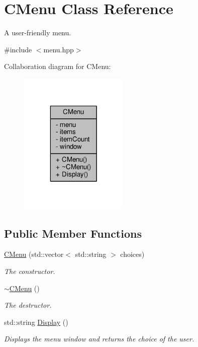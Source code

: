 \hypertarget{class_c_menu}{\section{C\-Menu Class Reference}
\label{class_c_menu}
}


A user-\/friendly menu.  




{\ttfamily \#include $<$menu.\-hpp$>$}



Collaboration diagram for C\-Menu\-:
\nopagebreak
\begin{figure}[H]
\begin{center}
\leavevmode
\includegraphics[width=148pt]{class_c_menu__coll__graph}
\end{center}
\end{figure}
\subsection*{Public Member Functions}
\begin{DoxyCompactItemize}
\item 
\hyperlink{class_c_menu_a8b1ad64c4215258c64d0e5d5a622ba76}{C\-Menu} (std\-::vector$<$ std\-::string $>$ choices)
\begin{DoxyCompactList}\small\item\em The constructor. \end{DoxyCompactList}\item 
\hyperlink{class_c_menu_ab2ab7e24e646bcb61ad0b9d8484f2604}{$\sim$\-C\-Menu} ()
\begin{DoxyCompactList}\small\item\em The destructor. \end{DoxyCompactList}\item 
std\-::string \hyperlink{class_c_menu_a6cc86670a0f6bfc0ac9a97d938226b5c}{Display} ()
\begin{DoxyCompactList}\small\item\em Displays the menu window and returns the choice of the user. \end{DoxyCompactList}\end{DoxyCompactItemize}
